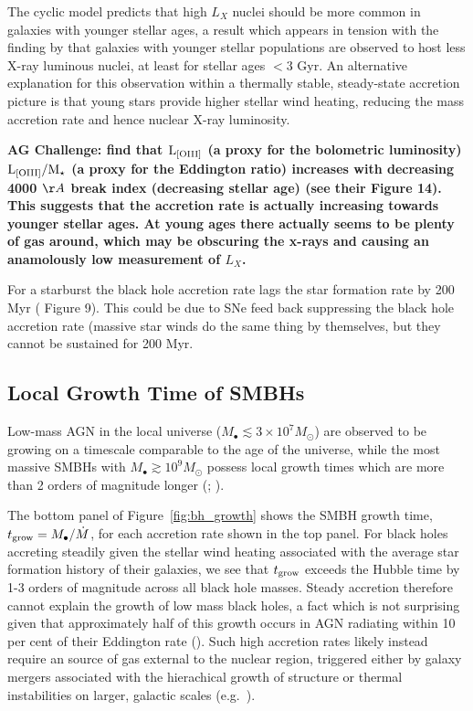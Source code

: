 \documentclass[usenatbib,fleqn]{mn2e}
\begin{document}
The cyclic model predicts that high $L_{X}$ nuclei should be more
common in galaxies with younger stellar ages, a result which appears
in tension with the finding by \citet{Pellegrini10} that galaxies with
younger stellar populations are observed to host less X-ray luminous
nuclei, at least for stellar ages $<3$ Gyr.  An alternative
explanation for this observation within a thermally stable,
steady-state accretion picture is that young stars provide higher
stellar wind heating, reducing the mass accretion rate and hence
nuclear X-ray luminosity.  {\bf AG Challenge: \citet{HeckmanBest:2014a}
  find that ${\rm L_{[OIII]}}$ (a proxy for the bolometric luminosity)
  ${\rm L_{[OIII]}/M_\star}$ (a proxy for the Eddington ratio)
  increases with decreasing 4000 $\AA$ break index (decreasing stellar
  age) (see their Figure 14). This suggests that the accretion rate is
  actually increasing towards younger stellar ages. At young ages
  there actually seems to be plenty of gas around, which may be
  obscuring the x-rays and causing an anamolously low measurement of
  $L_X$. 
  
  For a starburst the black hole accretion rate lags the star
  formation rate by 200 Myr (\citet{WildHeckman+:2010a} Figure
  9). This could be due to SNe feed back suppressing the black hole
  accretion rate (massive star winds do the same thing by themselves,
  but they cannot be sustained for 200 Myr. 
}


\subsection{Local Growth Time of SMBHs }
\label{sec:growth}

Low-mass AGN in the local universe ($M_{\bullet} \lesssim 3\times
10^{7}M_{\odot}$) are observed to be growing on a timescale comparable
to the age of the universe, while the most massive SMBHs with
$M_{\bullet} \gtrsim 10^{9}M_{\odot}$ possess local growth times which
are more than 2 orders of magnitude longer (\citealt{Heckman+04};
\citealt{Kauffmann&Heckman09}).

The bottom panel of Figure~\ref{fig:bh_growth} shows the SMBH growth
time, $t_{\rm grow} = M_{\bullet}/\dot{M}$, for each accretion rate
shown in the top panel.  For black holes accreting steadily given the
stellar wind heating associated with the average star formation
history of their galaxies, we see that $t_{\rm grow}$ exceeds the
Hubble time by 1-3 orders of magnitude across all black hole masses.
Steady accretion therefore cannot explain the growth of low mass black
holes, a fact which is not surprising given that approximately half of
this growth occurs in AGN radiating within 10 per cent of their
Eddington rate (\citealt{Heckman+04}).  Such high accretion rates
likely instead require an source of gas external to the nuclear
region, triggered either by galaxy mergers associated with the
hierachical growth of structure or thermal instabilities on larger,
galactic scales (e.g.~\citealt{Ciotti+10}).  
\end{document}
